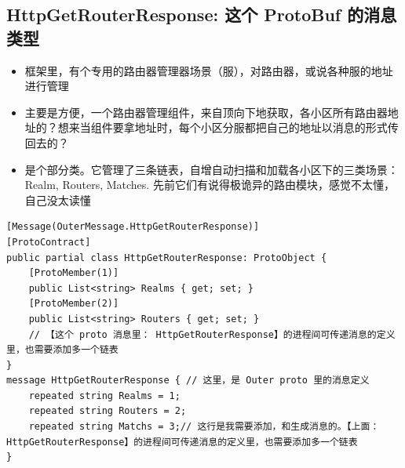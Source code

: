 \documentclass[9pt, b5paper]{article}
\begin{document}
\subsection{HttpGetRouterResponse: 这个 ProtoBuf 的消息类型}
\label{sec:orgd9c1ad8}
\begin{itemize}
\item 框架里，有个专用的路由器管理器场景（服），对路由器，或说各种服的地址进行管理
\item 主要是方便，一个路由器管理组件，来自顶向下地获取，各小区所有路由器地址的？想来当组件要拿地址时，每个小区分服都把自己的地址以消息的形式传回去的？
\item 是个部分类。它管理了三条链表，自增自动扫描和加载各小区下的三类场景：Realm, Routers, Matches. 先前它们有说得极诡异的路由模块，感觉不太懂，自己没太读懂
\end{itemize}
\begin{verbatim}
[Message(OuterMessage.HttpGetRouterResponse)]
[ProtoContract]
public partial class HttpGetRouterResponse: ProtoObject {
    [ProtoMember(1)]
    public List<string> Realms { get; set; }
    [ProtoMember(2)]
    public List<string> Routers { get; set; }
    // 【这个 proto 消息里： HttpGetRouterResponse】的进程间可传递消息的定义里，也需要添加多一个链表
}
message HttpGetRouterResponse { // 这里，是 Outer proto 里的消息定义
    repeated string Realms = 1;
    repeated string Routers = 2;
    repeated string Matchs = 3;// 这行是我需要添加，和生成消息的。【上面： HttpGetRouterResponse】的进程间可传递消息的定义里，也需要添加多一个链表
}
\end{verbatim}
\end{document}
